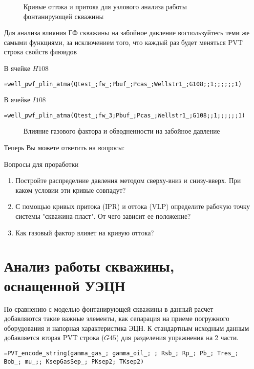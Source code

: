 \begin{figure}[h!]
	\center{\texttt{[image: Ex90\_3]}}
	\caption{Кривые оттока и притока для узлового анализа работы фонтанирующей скважины}
	\label{ris:Ex90_3}
\end{figure}

Для анализа влияния ГФ скважины на забойное давление воспользуйтесь теми же самыми функциями, за исключением того, что каждый раз будет меняться PVT строка свойств флюидов

В ячейке $H108$ 

{ \small  \texttt{=well\_pwf\_plin\_atma(Qtest\_;fw\_;Pbuf\_;Pcas\_;Wellstr1\_;G108;;1;;;;;;1)}}

В ячейке $I108$ 

{ \small  \texttt{=well\_pwf\_plin\_atma(Qtest\_;fw\_3;Pbuf\_;Pcas\_;Wellstr1\_;G108;;1;;;;;;1)}}

\begin{figure}[h!]
	\center{\texttt{[image: Ex90\_4]}}
	\caption{Влияние газового фактора и обводненности на забойное давление}
	\label{ris:Ex90_4}
\end{figure}

Теперь Вы можете ответить на вопросы:

Вопросы для проработки

\begin{enumerate}
	\item Постройте распределние давления методом сверху-вниз и снизу-вверх. При каком условии эти кривые совпадут?
	\item С помощью кривых притока  (IPR) и оттока (VLP) определите рабочую точку системы "скважина-пласт". От чего зависит ее положение?
	\item Как газовый фактор влияет на кривую оттока?
\end{enumerate}

\section{Анализ работы скважины, оснащенной УЭЦН}

По сравнению с моделью фонтанирующей скважины в данный расчет добавляются такие важные элементы, как сепарация на приеме погружного оборудования и напорная характеристика ЭЦН. К стандартным исходным данным добавляется вторая PVT строка ($G45$) для разделения упражнения на 2 части. 

{ \small  \texttt{=PVT\_encode\_string(gamma\_gas\_; gamma\_oil\_; ; Rsb\_; Rp\_; Pb\_; Tres\_; Bob\_; mu\_;; KsepGasSep\_; PKsep2; TKsep2)
}}

